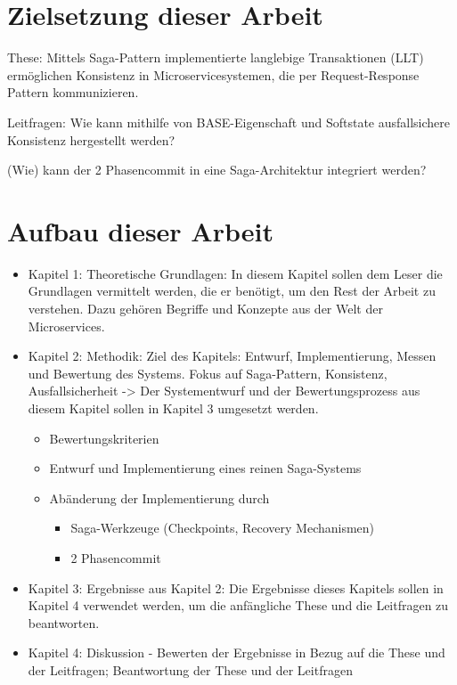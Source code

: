 \section{Zielsetzung dieser Arbeit}

These: Mittels Saga-Pattern implementierte langlebige Transaktionen (LLT) ermöglichen Konsistenz in Microservicesystemen, die per Request-Response Pattern kommunizieren. 

Leitfragen: 
Wie kann mithilfe von BASE-Eigenschaft und Softstate ausfallsichere Konsistenz hergestellt werden?

(Wie) kann der 2 Phasencommit in eine Saga-Architektur integriert werden?

\section{Aufbau dieser Arbeit}

\begin{itemize}
	\item Kapitel 1: Theoretische Grundlagen: In diesem Kapitel sollen dem Leser die Grundlagen vermittelt werden, die er benötigt, um den Rest der Arbeit zu verstehen. Dazu gehören Begriffe und Konzepte aus der Welt der Microservices. 
	\item Kapitel 2: Methodik: Ziel des Kapitels: Entwurf, Implementierung, Messen und Bewertung des Systems. Fokus auf Saga-Pattern, Konsistenz, Ausfallsicherheit -> Der Systementwurf und der Bewertungsprozess aus diesem Kapitel sollen in Kapitel 3 umgesetzt werden.
	\begin{itemize}
		\item Bewertungskriterien
		\item Entwurf und Implementierung eines reinen Saga-Systems
		\item Abänderung der Implementierung durch 
		\begin{itemize}
			\item Saga-Werkzeuge (Checkpoints, Recovery Mechanismen)
			\item 2 Phasencommit
		\end{itemize}
	\end{itemize}
	\item Kapitel 3: Ergebnisse aus Kapitel 2: Die Ergebnisse dieses Kapitels sollen in Kapitel 4 verwendet werden, um die anfängliche These und die Leitfragen zu beantworten.
	\item Kapitel 4: Diskussion - Bewerten der Ergebnisse in Bezug auf die These und der Leitfragen; Beantwortung der These und der Leitfragen
	
\end{itemize}